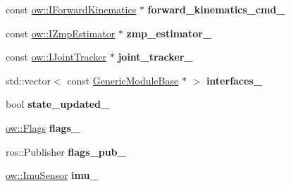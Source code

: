 \begin{DoxyCompactItemize}
\item 
const \hyperlink{classow_1_1IForwardKinematics}{ow\+::\+I\+Forward\+Kinematics} $\ast$ {\bfseries forward\+\_\+kinematics\+\_\+cmd\+\_\+}\hypertarget{classow__pub_1_1StatePublisher_ae25df068ab4f669b0dee6a057adae589}{}\label{classow__pub_1_1StatePublisher_ae25df068ab4f669b0dee6a057adae589}

\item 
const \hyperlink{classow_1_1IZmpEstimator}{ow\+::\+I\+Zmp\+Estimator} $\ast$ {\bfseries zmp\+\_\+estimator\+\_\+}\hypertarget{classow__pub_1_1StatePublisher_a800d8c184679b3f514ebf0df95c487f9}{}\label{classow__pub_1_1StatePublisher_a800d8c184679b3f514ebf0df95c487f9}

\item 
const \hyperlink{classow_1_1IJointTracker}{ow\+::\+I\+Joint\+Tracker} $\ast$ {\bfseries joint\+\_\+tracker\+\_\+}\hypertarget{classow__pub_1_1StatePublisher_a36b194b530febbb0575d515bd67fbdd8}{}\label{classow__pub_1_1StatePublisher_a36b194b530febbb0575d515bd67fbdd8}

\item 
std\+::vector$<$ const \hyperlink{classow_1_1GenericModuleBase_acdbc9380752e797b3093d6f5fb506b76}{Generic\+Module\+Base} $\ast$ $>$ {\bfseries interfaces\+\_\+}\hypertarget{classow__pub_1_1StatePublisher_a54402f12cc515077bcb0cb17992c2520}{}\label{classow__pub_1_1StatePublisher_a54402f12cc515077bcb0cb17992c2520}

\item 
bool {\bfseries state\+\_\+updated\+\_\+}\hypertarget{classow__pub_1_1StatePublisher_a298d08ff188a54fee8bedc40d3cb274f}{}\label{classow__pub_1_1StatePublisher_a298d08ff188a54fee8bedc40d3cb274f}

\item 
\hyperlink{classow__core_1_1Flags}{ow\+::\+Flags} {\bfseries flags\+\_\+}\hypertarget{classow__pub_1_1StatePublisher_a5eebe0d190f763f5859b1da9086b6a71}{}\label{classow__pub_1_1StatePublisher_a5eebe0d190f763f5859b1da9086b6a71}

\item 
ros\+::\+Publisher {\bfseries flags\+\_\+pub\+\_\+}\hypertarget{classow__pub_1_1StatePublisher_a840c3e631add917178b26a58b232ab88}{}\label{classow__pub_1_1StatePublisher_a840c3e631add917178b26a58b232ab88}

\item 
\hyperlink{classow__core_1_1InertialMeasurmentUnitSensor}{ow\+::\+Imu\+Sensor} {\bfseries imu\+\_\+}\hypertarget{classow__pub_1_1StatePublisher_a36528fa1701be79bc6958ad562302159}{}\label{classow__pub_1_1StatePublisher_a36528fa1701be79bc6958ad562302159}


\end{DoxyCompactItemize}
